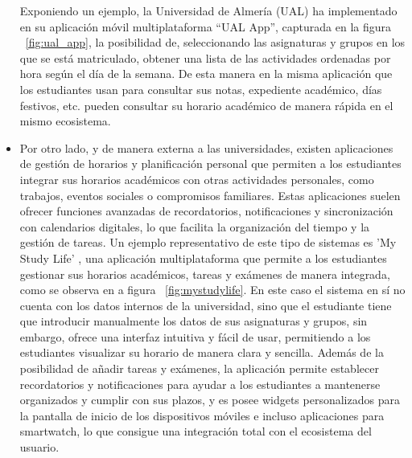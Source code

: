 \begin{itemize}
      Exponiendo un ejemplo, la Universidad de Almería (UAL) ha implementado en su aplicación móvil multiplataforma ``UAL App'', capturada en la figura ~\ref{fig:ual_app}, la posibilidad de, seleccionando las asignaturas y grupos en los que se está matriculado, obtener
      una lista de las actividades ordenadas por hora según el día de la semana.
      \newline
      De esta manera en la misma aplicación que los estudiantes usan para consultar sus notas, expediente académico, días festivos, etc. pueden consultar su horario académico de manera rápida en el mismo ecosistema.

      \item Por otro lado, y de manera externa a las universidades, existen aplicaciones de gestión de horarios y planificación personal que permiten a los estudiantes integrar sus horarios académicos con otras actividades personales, como trabajos, eventos sociales o compromisos familiares. 
      \newline\newline
      Estas aplicaciones suelen ofrecer funciones avanzadas de recordatorios, notificaciones y sincronización con calendarios digitales, lo que facilita la organización del tiempo y la gestión de tareas.
      Un ejemplo representativo de este tipo de sistemas es 'My Study Life' \cite{webMyStudyLife}, una aplicación multiplataforma que permite a los estudiantes gestionar sus horarios académicos, tareas y exámenes de manera integrada, como se observa en a figura ~\ref{fig:mystudylife}. En este caso el sistema en sí no cuenta con los datos internos de la universidad, sino que el estudiante tiene que introducir manualmente los datos de sus asignaturas y grupos, sin embargo, ofrece una interfaz intuitiva y fácil de usar, permitiendo a los estudiantes visualizar su horario de manera clara y sencilla.
      Además de la posibilidad de añadir tareas y exámenes, la aplicación permite establecer recordatorios y notificaciones para ayudar a los estudiantes a mantenerse organizados y cumplir con sus plazos, y es posee widgets personalizados para la pantalla de inicio de los dispositivos móviles e incluso aplicaciones para smartwatch, lo que consigue una integración total con el ecosistema del usuario.


\end{itemize}
